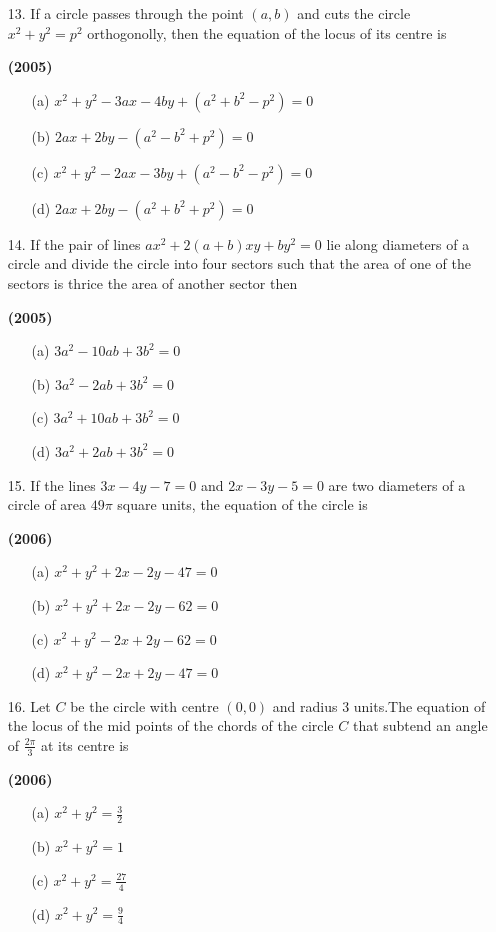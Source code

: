 \documentclass[journal,12pt,twocolumn]{IEEEtran}
\theoremstyle{remark}
\begin{document}
\begin{enumerate}
\item[13.]If a circle passes through the point $(a,b)$ and cuts the circle $x^2+y^2=p^2$ orthogonolly, then the equation of the locus of its centre is 

\hfill{\textbf{(2005)}}

\begin{enumerate}
\item[(a)] $x^2+y^2-3ax-4by+(a^2+b^2-p^2)=0$
\item[(b)] $2ax+2by-(a^2-b^2+p^2)=0$
\item[(c)] $x^2+y^2-2ax-3by+(a^2-b^2-p^2)=0$
\item[(d)] $2ax+2by-(a^2+b^2+p^2)=0$
\end{enumerate}
\end{enumerate}
\begin{enumerate}
\item[14.]If the pair of lines $ax^2+2(a+b)xy+by^2=0$ lie along diameters of a circle and divide the circle into four sectors such that the area of one of the sectors is thrice the area of another sector then

\hfill{\textbf{(2005)}}

\begin{enumerate}
\item[(a)] $3a^2-10ab+3b^2=0$
\item[(b)] $3a^2-2ab+3b^2=0$
\item[(c)] $3a^2+10ab+3b^2=0$
\item[(d)] $3a^2+2ab+3b^2=0$
\end{enumerate}
\end{enumerate}
\begin{enumerate}
\item[15.]If the lines $3x-4y-7=0$ and $2x-3y-5=0$ are two diameters of a circle of area $49\pi$ square units, the equation of the circle is 

\hfill{\textbf{(2006)}}

\begin{enumerate}
\item[(a)] $x^2+y^2+2x-2y-47=0$
\item[(b)] $x^2+y^2+2x-2y-62=0$
\item[(c)] $x^2+y^2-2x+2y-62=0$
\item[(d)] $x^2+y^2-2x+2y-47=0$
\end{enumerate}
\end{enumerate}
\begin{enumerate}
\item[16.]Let $C$ be the circle with centre $(0,0)$ and radius 3 units.The equation of the locus of the mid points of the chords of the circle $C$ that subtend an angle of $\frac{2\pi}{3}$ at its centre is

\hfill{\textbf{(2006)}}

\begin{enumerate}
\item[(a)] $x^2+y^2=\frac{3}{2}$
\item[(b)] $x^2+y^2=1$
\item[(c)] $x^2+y^2=\frac{27}{4}$
\item[(d)] $x^2+y^2=\frac{9}{4}$
\end{enumerate}
\end{enumerate}
\end{document}
